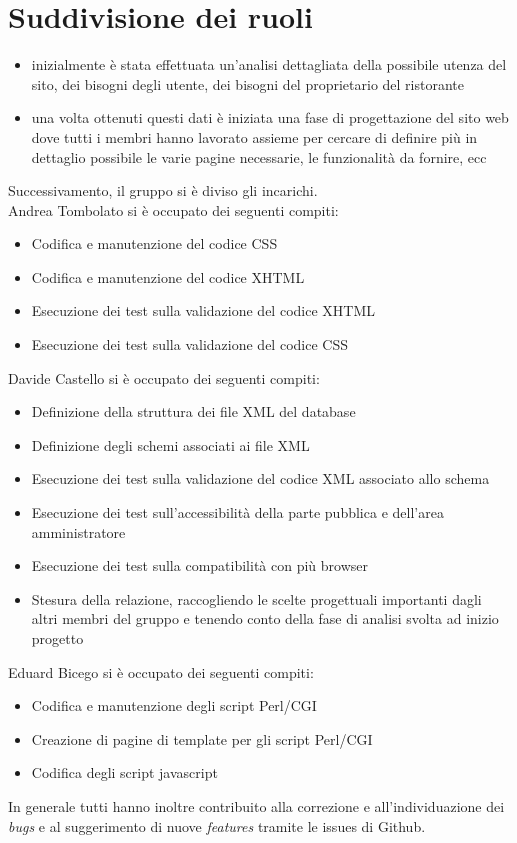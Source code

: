 \documentclass[../relazione.tex]{subfiles}
\begin{document}
\section{Suddivisione dei ruoli}
	\begin{itemize}
		\item inizialmente è stata effettuata un'analisi dettagliata della possibile utenza del sito, dei bisogni degli utente, dei bisogni del proprietario del ristorante
		\item una volta ottenuti questi dati è iniziata una fase di progettazione del sito web dove tutti i membri hanno lavorato assieme per cercare di definire più in dettaglio possibile le varie pagine necessarie, le funzionalità da fornire, ecc
	\end{itemize}
	Successivamento, il gruppo si è diviso gli incarichi.\\
	Andrea Tombolato si è occupato dei seguenti compiti:
	\begin{itemize}
		\item Codifica e manutenzione del codice CSS
		\item Codifica e manutenzione del codice XHTML
		\item Esecuzione dei test sulla validazione del codice XHTML
		\item Esecuzione dei test sulla validazione del codice CSS
	\end{itemize}
	Davide Castello si è occupato dei seguenti compiti:
	\begin{itemize}
		\item Definizione della struttura dei file XML del database
		\item Definizione degli schemi associati ai file XML
		\item Esecuzione dei test sulla validazione del codice XML associato allo schema
		\item Esecuzione dei test sull’accessibilità della parte pubblica e dell'area amministratore
		\item Esecuzione dei test sulla compatibilità con più browser
		\item Stesura della relazione, raccogliendo le scelte progettuali importanti dagli altri membri del gruppo e tenendo conto della fase di analisi svolta ad inizio progetto
	\end{itemize}
	Eduard Bicego si è occupato dei seguenti compiti:
	\begin{itemize}
		\item Codifica e manutenzione degli script Perl/CGI
		\item Creazione di pagine di template per gli script Perl/CGI
		\item Codifica degli script javascript
	\end{itemize}
	In generale tutti hanno inoltre contribuito alla correzione e all’individuazione dei \textit{bugs} e al suggerimento di nuove \textit{features} tramite le issues di Github.
\end{document}
